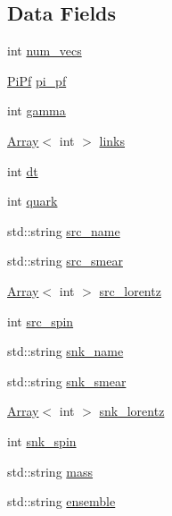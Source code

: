 \subsection*{Data Fields}
\begin{DoxyCompactItemize}
\item 
int \mbox{\hyperlink{structFF_1_1KeyHadron3PtCorr__t_a881515c84e9bb33ec7414c33954e0441}{num\+\_\+vecs}}
\item 
\mbox{\hyperlink{structFF_1_1PiPf}{Pi\+Pf}} \mbox{\hyperlink{structFF_1_1KeyHadron3PtCorr__t_af40307c905ef0f4f5b4a936e2e14d002}{pi\+\_\+pf}}
\item 
int \mbox{\hyperlink{structFF_1_1KeyHadron3PtCorr__t_a6d0db81eeb2603b388945b05256c4494}{gamma}}
\item 
\mbox{\hyperlink{classXMLArray_1_1Array}{Array}}$<$ int $>$ \mbox{\hyperlink{structFF_1_1KeyHadron3PtCorr__t_a68efc7ab7a68079ef90f162ff27d233b}{links}}
\item 
int \mbox{\hyperlink{structFF_1_1KeyHadron3PtCorr__t_a410a41c9699d38288be697c8f9cee6f9}{dt}}
\item 
int \mbox{\hyperlink{structFF_1_1KeyHadron3PtCorr__t_a07d5fea629189b0cee42af388e1253b4}{quark}}
\item 
std\+::string \mbox{\hyperlink{structFF_1_1KeyHadron3PtCorr__t_aca4d5e4d4cbd09635ff9a3284dad1fae}{src\+\_\+name}}
\item 
std\+::string \mbox{\hyperlink{structFF_1_1KeyHadron3PtCorr__t_a36b6357d110bc1374cbc7b525aa5422c}{src\+\_\+smear}}
\item 
\mbox{\hyperlink{classXMLArray_1_1Array}{Array}}$<$ int $>$ \mbox{\hyperlink{structFF_1_1KeyHadron3PtCorr__t_a087ee3dfc6a4980bd005f140b8f49bcb}{src\+\_\+lorentz}}
\item 
int \mbox{\hyperlink{structFF_1_1KeyHadron3PtCorr__t_aa842ee681c4c8e31581441b4c7d965a0}{src\+\_\+spin}}
\item 
std\+::string \mbox{\hyperlink{structFF_1_1KeyHadron3PtCorr__t_a06874998c1fd25f30a6fc81e24b9bdab}{snk\+\_\+name}}
\item 
std\+::string \mbox{\hyperlink{structFF_1_1KeyHadron3PtCorr__t_aeb50f756ad34ee3e27bf8b00c622a374}{snk\+\_\+smear}}
\item 
\mbox{\hyperlink{classXMLArray_1_1Array}{Array}}$<$ int $>$ \mbox{\hyperlink{structFF_1_1KeyHadron3PtCorr__t_ad9ceb5d6b1fbf53fc720de011f11649f}{snk\+\_\+lorentz}}
\item 
int \mbox{\hyperlink{structFF_1_1KeyHadron3PtCorr__t_a34743d7f9d65289c23536ddb429e8950}{snk\+\_\+spin}}
\item 
std\+::string \mbox{\hyperlink{structFF_1_1KeyHadron3PtCorr__t_aea7049020ee3d6c97bf27e59675e8281}{mass}}
\item 
std\+::string \mbox{\hyperlink{structFF_1_1KeyHadron3PtCorr__t_ae1e85cda8eb7573c0b7cacb2704fada1}{ensemble}}
\end{DoxyCompactItemize}


